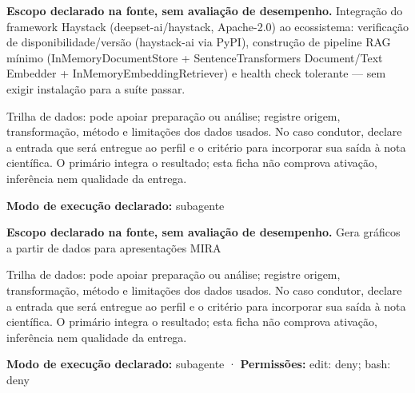 
\begin{descricao}
\textbf{Escopo declarado na fonte, sem avaliação de desempenho.}
Integração do framework Haystack (deepset-ai/haystack, Apache-2.0) ao ecossistema: verificação de disponibilidade/versão (haystack-ai via PyPI), construção de pipeline RAG mínimo (InMemoryDocumentStore + SentenceTransformers Document/Text Embedder + InMemoryEmbeddingRetriever) e health check tolerante — sem exigir instalação para a suíte passar.
\end{descricao}

\begin{funcao}
Trilha de dados: pode apoiar preparação ou análise; registre origem, transformação, método e limitações dos dados usados. No caso condutor, declare a entrada que será entregue ao perfil e o critério para incorporar sua saída à nota científica. O primário integra o resultado; esta ficha não comprova ativação, inferência nem qualidade da entrega.
\end{funcao}

\begin{arquitetura}
\textbf{Modo de execução declarado:} subagente
\end{arquitetura}


\begin{descricao}
\textbf{Escopo declarado na fonte, sem avaliação de desempenho.}
Gera gráficos a partir de dados para apresentações MIRA
\end{descricao}

\begin{funcao}
Trilha de dados: pode apoiar preparação ou análise; registre origem, transformação, método e limitações dos dados usados. No caso condutor, declare a entrada que será entregue ao perfil e o critério para incorporar sua saída à nota científica. O primário integra o resultado; esta ficha não comprova ativação, inferência nem qualidade da entrega.
\end{funcao}

\begin{arquitetura}
\textbf{Modo de execução declarado:} subagente · \textbf{Permissões:} edit: deny; bash: deny
\end{arquitetura}

